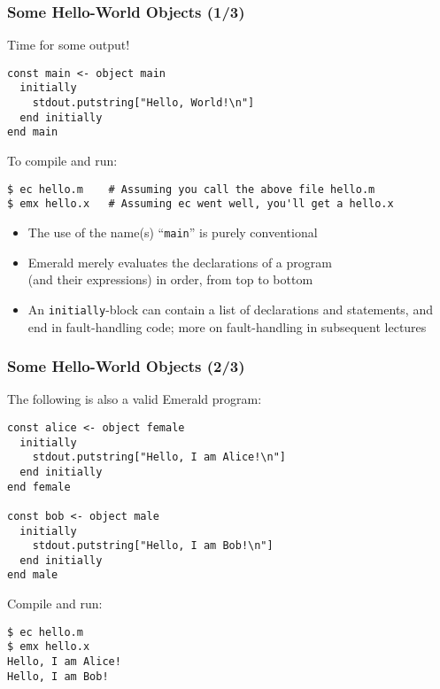 \begin{frame}[fragile]

\frametitle{Some Hello-World Objects (1/3)}

Time for some output!

\begin{lstlisting}
const main <- object main
  initially
    stdout.putstring["Hello, World!\n"]
  end initially
end main
\end{lstlisting}

To compile and run:

\begin{lstlisting}
$ ec hello.m    # Assuming you call the above file hello.m
$ emx hello.x   # Assuming ec went well, you'll get a hello.x
\end{lstlisting}

\begin{itemize}

\item The use of the name(s) ``\texttt{main}'' is purely conventional

\item Emerald merely evaluates the declarations of a program\\ (and
their expressions) in order, from top to bottom

\item An \texttt{initially}-block can contain a list of declarations
and statements, and end in fault-handling code; more on fault-handling
in subsequent lectures

\end{itemize}

\end{frame}

\begin{frame}[fragile]

\frametitle{Some Hello-World Objects (2/3)}

The following is also a valid Emerald program:

\begin{lstlisting}
const alice <- object female
  initially
    stdout.putstring["Hello, I am Alice!\n"]
  end initially
end female

const bob <- object male
  initially
    stdout.putstring["Hello, I am Bob!\n"]
  end initially
end male
\end{lstlisting}

Compile and run:

\begin{lstlisting}
$ ec hello.m
$ emx hello.x
Hello, I am Alice!
Hello, I am Bob!
\end{lstlisting}

\end{frame}

